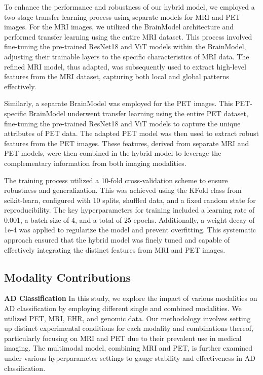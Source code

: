 To enhance the performance and robustness of our hybrid model, we employed a two-stage transfer learning process using separate models for MRI and PET images. For the MRI images, we utilized the BrainModel architecture and performed transfer learning using the entire MRI dataset. This process involved fine-tuning the pre-trained ResNet18 and ViT models within the BrainModel, adjusting their trainable layers to the specific characteristics of MRI data. The refined MRI model, thus adapted, was subsequently used to extract high-level features from the MRI dataset, capturing both local and global patterns effectively.

Similarly, a separate BrainModel was employed for the PET images. This PET-specific BrainModel underwent transfer learning using the entire PET dataset, fine-tuning the pre-trained ResNet18 and ViT models to capture the unique attributes of PET data. The adapted PET model was then used to extract robust features from the PET images. These features, derived from separate MRI and PET models, were then combined in the hybrid model to leverage the complementary information from both imaging modalities.

The training process utilized a 10-fold cross-validation scheme to ensure robustness and generalization. This was achieved using the KFold class from scikit-learn, configured with 10 splits, shuffled data, and a fixed random state for reproducibility. The key hyperparameters for training included a learning rate of 0.001, a batch size of 4, and a total of 25 epochs. Additionally, a weight decay of 1e-4 was applied to regularize the model and prevent overfitting. This systematic approach ensured that the hybrid model was finely tuned and capable of effectively integrating the distinct features from MRI and PET images.

\subsection{Modality Contributions}
\textbf{AD Classification}
In this study, we explore the impact of various modalities on AD classification by employing different single and combined modalities. We utilized PET, MRI, EHR, and genomic data. Our methodology involves setting up distinct experimental conditions for each modality and combinations thereof, particularly focusing on MRI and PET due to their prevalent use in medical imaging. The multimodal model, combining MRI and PET, is further examined under various hyperparameter settings to gauge stability and effectiveness in AD classification. 

